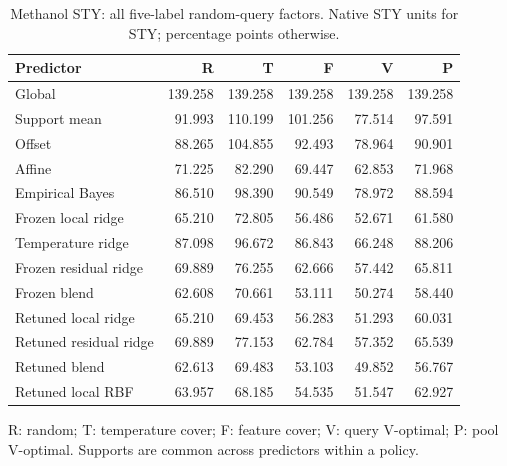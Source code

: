 \begin{table}[htbp]\centering\small
\caption{Methanol STY: all five-label random-query factors. Native STY units for STY; percentage points otherwise.}
\begin{tabular}{lrrrrr}\toprule Predictor & R & T & F & V & P\\\midrule
Global & 139.258 & 139.258 & 139.258 & 139.258 & 139.258\\
Support mean & 91.993 & 110.199 & 101.256 & 77.514 & 97.591\\
Offset & 88.265 & 104.855 & 92.493 & 78.964 & 90.901\\
Affine & 71.225 & 82.290 & 69.447 & 62.853 & 71.968\\
Empirical Bayes & 86.510 & 98.390 & 90.549 & 78.972 & 88.594\\
Frozen local ridge & 65.210 & 72.805 & 56.486 & 52.671 & 61.580\\
Temperature ridge & 87.098 & 96.672 & 86.843 & 66.248 & 88.206\\
Frozen residual ridge & 69.889 & 76.255 & 62.666 & 57.442 & 65.811\\
Frozen blend & 62.608 & 70.661 & 53.111 & 50.274 & 58.440\\
Retuned local ridge & 65.210 & 69.453 & 56.283 & 51.293 & 60.031\\
Retuned residual ridge & 69.889 & 77.153 & 62.784 & 57.352 & 65.539\\
Retuned blend & 62.613 & 69.483 & 53.103 & 49.852 & 56.767\\
Retuned local RBF & 63.957 & 68.185 & 54.535 & 51.547 & 62.927\\
\bottomrule\end{tabular}\par\smallskip\footnotesize R: random; T: temperature cover; F: feature cover; V: query V-optimal; P: pool V-optimal. Supports are common across predictors within a policy.\end{table}\FloatBarrier
